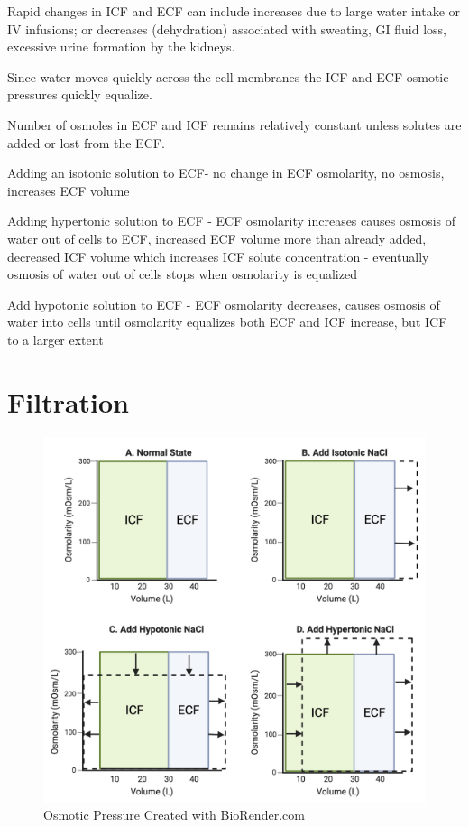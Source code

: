 Rapid changes in ICF and ECF can include increases due to large water intake or IV infusions; or decreases (dehydration) associated with sweating, GI fluid loss, excessive urine formation by the kidneys.

Since water moves quickly across the cell membranes the ICF and ECF osmotic pressures quickly equalize. 

Number of osmoles in ECF and ICF remains relatively constant unless solutes are added or lost from the ECF. 

Adding an isotonic solution to ECF- no change in ECF osmolarity, no osmosis, increases ECF volume

Adding hypertonic solution to ECF - ECF osmolarity increases causes osmosis of water out of cells to ECF, increased ECF volume more than already added, decreased ICF volume which increases ICF solute concentration - eventually osmosis of water out of cells stops when osmolarity is equalized

Add hypotonic solution to ECF - ECF osmolarity decreases, causes osmosis of water into cells until osmolarity equalizes both ECF and ICF increase, but ICF to a larger extent



\section{Filtration}


\begin{figure}[!h]
    \centering
    \includegraphics[width=1\linewidth]{./figure/iso_hypo_hypertonic.png}
    \caption{Osmotic Pressure \footnotesize{Created with BioRender.com}}
    \label{fig:iso_hypo_hypertonic}
\end{figure}



